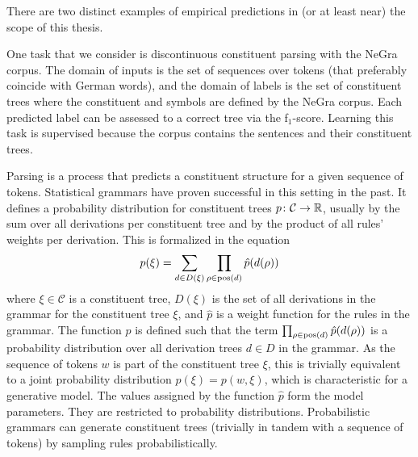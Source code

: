 \documentclass[../document.tex]{subfiles}
\begin{document}
    There are two distinct examples of empirical predictions in (or at least near) the scope of this thesis.

    \begin{example}
        One task that we consider is discontinuous constituent parsing with the NeGra corpus.
        The domain of inputs is the set of sequences over tokens (that preferably coincide with German words), and the domain of labels is the set of constituent trees where the constituent and  symbols are defined by the NeGra corpus.
        Each predicted label can be assessed to a correct tree via the f$_1$-score.
        Learning this task is supervised because the corpus contains the sentences and their constituent trees.

        Parsing is a process that predicts a constituent structure for a given sequence of tokens.
        Statistical grammars have proven successful in this setting in the past.
        It defines a probability distribution for constituent trees \(p\colon \mathcal{C} \to \mathbb{R}\), usually by the sum over all derivations per constituent tree and by the product of all rules' weights per derivation.
        This is formalized in the equation \[
        p(\xi) = \sum_{d \in D(\xi)} \prod_{\rho \in \operatorname{pos}(d)} \hat{p}(d(\rho))
        \]
        where \(\xi \in \mathcal{C}\) is a constituent tree, \(D(\xi)\) is the set of all derivations in the grammar for the constituent tree \(\xi\), and \(\hat{p}\) is a weight function for the rules in the grammar.
        The function \(\hat{p}\) is defined such that the term \(\prod_{\rho \in \operatorname{pos}(d)} \hat{p}(d(\rho))\) is a probability distribution over all derivation trees \(d \in D\) in the grammar.
        As the sequence of tokens \(w\) is part of the constituent tree \(\xi\), this is trivially equivalent to a joint probability distribution \(p(\xi) = p(w, \xi)\), which is characteristic for a generative model.
        The values assigned by the function \(\hat{p}\) form the model parameters. They are restricted to probability distributions.
        Probabilistic grammars can generate constituent trees (trivially in tandem with a sequence of tokens) by sampling rules probabilistically.
    \end{example}
\end{document}
